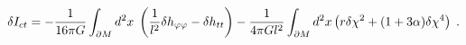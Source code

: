 \begin{equation}
\delta I_{ct}=-\frac{1}{16\pi G}\int_{\partial M}d^{2}x\;\left( \frac{1}{%
l^{2}}\delta h_{\varphi \varphi }-\delta h_{tt}\right) -\frac{1}{4\pi Gl^{2}}%
\int_{\partial M}d^{2}x\left( r\delta \chi ^{2}+(1+3\alpha )\delta \chi
^{4}\right) \;.  \label{DeltaIct}
\end{equation}

